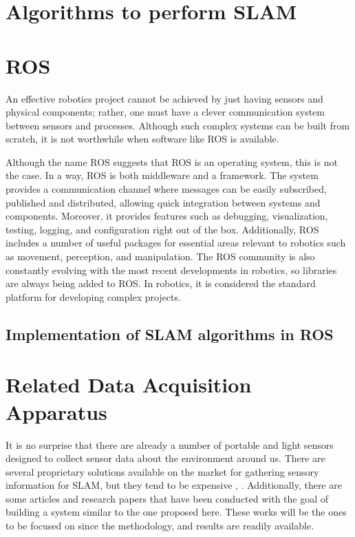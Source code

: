 
\section{Algorithms to perform \acs*{SLAM}}



\section{\acs{ROS}}

An effective robotics project cannot be achieved by just having sensors and physical components; rather, one must have a clever communication system between sensors and processes. Although such complex systems can be built from scratch, it is not worthwhile when software like \acs*{ROS} is available.

Although the name \acl*{ROS} suggests that ROS is an operating system, this is not the case.  In a way, \acs*{ROS} is both middleware and a framework. The system provides a communication channel where messages can be easily subscribed, published and distributed, allowing quick integration between systems and components. Moreover, it provides features such as debugging, visualization, testing, logging, and configuration right out of the box. Additionally, ROS includes a number of useful packages for essential areas relevant to robotics such as movement, perception, and manipulation. The ROS community is also constantly evolving with the most recent developments in robotics, so libraries are always being added to ROS. In robotics, it is considered the standard platform for developing complex projects.

\subsection{Implementation of \acs*{SLAM} algorithms in \acs*{ROS}}



\section{Related Data Acquisition Apparatus}

It is no surprise that there are already a number of portable and light sensors designed to collect sensor data about the environment around us. There are several proprietary solutions available on the market for gathering sensory information for \acs*{SLAM}, but they tend to be expensive \cite{libackpack_C50}, \cite{libackpack_DGC50}. Additionally, there are some articles and research papers that have been conducted with the goal of building a system similar to the one proposed here. These works will be the ones to be focused on since the methodology, and results are readily available.

